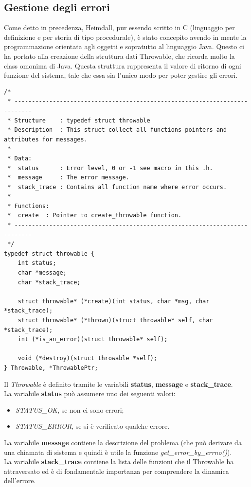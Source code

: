 \documentclass[italian]{tktltiki2}
\begin{document}
\subsection{Gestione degli errori}
\label{sec:errors}
Come detto in precedenza, Heimdall, pur essendo scritto in C (linguaggio per definizione e per storia di tipo procedurale), è stato concepito avendo in mente la programmazione orientata agli oggetti e sopratutto al linguaggio Java. Questo ci ha portato alla creazione della struttura dati Throwable, che ricorda molto la class omonima di Java\cite{throwable_java}.
Questa struttura rappresenta il valore di ritorno di ogni funzione del sistema, tale che essa sia l'unico modo per poter gestire gli errori.
\begin{lstlisting}
/*
 * ---------------------------------------------------------------------------
 * Structure    : typedef struct throwable
 * Description  : This struct collect all functions pointers and attributes for messages.
 *
 * Data:
 *  status      : Error level, 0 or -1 see macro in this .h.
 *  message     : The error message.
 *  stack_trace : Contains all function name where error occurs.
 *
 * Functions:
 *  create  : Pointer to create_throwable function.
 * ---------------------------------------------------------------------------
 */
typedef struct throwable {
    int status;
    char *message;
    char *stack_trace;

    struct throwable* (*create)(int status, char *msg, char *stack_trace);
    struct throwable* (*thrown)(struct throwable* self, char *stack_trace);
    int (*is_an_error)(struct throwable* self);
    
    void (*destroy)(struct throwable *self);
} Throwable, *ThrowablePtr;
\end{lstlisting} 
Il \emph{Throwable} è definito tramite le variabili \textbf{status}, \textbf{message} e \textbf{stack\_trace}. \\
La variabile \textbf{status} può assumere uno dei seguenti valori:
\begin{itemize}
  \item \emph{STATUS\_OK}, se non ci sono errori;
  \item \emph{STATUS\_ERROR}, se si è verificato qualche errore.
\end{itemize}
La variabile \textbf{message} contiene la descrizione del problema (che può derivare da una chiamata di sistema e quindi è utile la funzione \emph{get\_error\_by\_errno()}).
\\
La variabile \textbf{stack\_trace} contiene la lista delle funzioni che il Throwable ha attraversato ed è di fondamentale importanza per comprendere la dinamica dell'errore.
\end{document}
